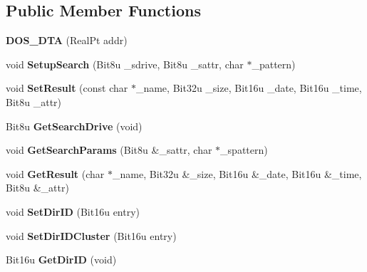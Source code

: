 \subsection*{Public Member Functions}
\begin{DoxyCompactItemize}
\item 
\hypertarget{classDOS__DTA_a26b5d5147e35f2b65dd6ef0cae1734e5}{{\bfseries D\-O\-S\-\_\-\-D\-T\-A} (Real\-Pt addr)}\label{classDOS__DTA_a26b5d5147e35f2b65dd6ef0cae1734e5}

\item 
\hypertarget{classDOS__DTA_ae15099c285096d3c32ef7b0f947a338d}{void {\bfseries Setup\-Search} (Bit8u \-\_\-sdrive, Bit8u \-\_\-sattr, char $\ast$\-\_\-pattern)}\label{classDOS__DTA_ae15099c285096d3c32ef7b0f947a338d}

\item 
\hypertarget{classDOS__DTA_ae09318ca38b32bff0df8a0ee88ec2151}{void {\bfseries Set\-Result} (const char $\ast$\-\_\-name, Bit32u \-\_\-size, Bit16u \-\_\-date, Bit16u \-\_\-time, Bit8u \-\_\-attr)}\label{classDOS__DTA_ae09318ca38b32bff0df8a0ee88ec2151}

\item 
\hypertarget{classDOS__DTA_a055cb2b2f1fcf3fd76ee76bbd608da30}{Bit8u {\bfseries Get\-Search\-Drive} (void)}\label{classDOS__DTA_a055cb2b2f1fcf3fd76ee76bbd608da30}

\item 
\hypertarget{classDOS__DTA_a770f5e91477a855386972cc2d530a346}{void {\bfseries Get\-Search\-Params} (Bit8u \&\-\_\-sattr, char $\ast$\-\_\-spattern)}\label{classDOS__DTA_a770f5e91477a855386972cc2d530a346}

\item 
\hypertarget{classDOS__DTA_a42642ddf3f4fceb24592262dd3221cac}{void {\bfseries Get\-Result} (char $\ast$\-\_\-name, Bit32u \&\-\_\-size, Bit16u \&\-\_\-date, Bit16u \&\-\_\-time, Bit8u \&\-\_\-attr)}\label{classDOS__DTA_a42642ddf3f4fceb24592262dd3221cac}

\item 
\hypertarget{classDOS__DTA_ae695e3b2d7507351b4f68fd855f62942}{void {\bfseries Set\-Dir\-I\-D} (Bit16u entry)}\label{classDOS__DTA_ae695e3b2d7507351b4f68fd855f62942}

\item 
\hypertarget{classDOS__DTA_a9077446d68d8383d59a932d55ad4ddc4}{void {\bfseries Set\-Dir\-I\-D\-Cluster} (Bit16u entry)}\label{classDOS__DTA_a9077446d68d8383d59a932d55ad4ddc4}

\item 
\hypertarget{classDOS__DTA_ac6562d1dd41f1f2b0874647e82a62289}{Bit16u {\bfseries Get\-Dir\-I\-D} (void)}\label{classDOS__DTA_ac6562d1dd41f1f2b0874647e82a62289}


\end{DoxyCompactItemize}
